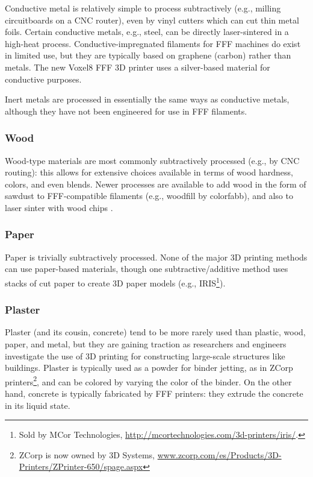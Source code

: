Conductive metal is relatively simple to process subtractively (e.g., milling circuitboards on a CNC router), even by vinyl cutters which can cut thin metal foils. Certain conductive metals, e.g., steel, can be directly laser-sintered in a high-heat process. Conductive-impregnated filaments for FFF machines do exist in limited use, but they are typically based on graphene (carbon) rather than metals. The new Voxel8 FFF 3D printer \cite{voxel8} uses a silver-based material for conductive purposes.

Inert metals are processed in essentially the same ways as conductive metals, although they have not been engineered for use in FFF filaments.

\subsubsection{Wood}

Wood-type materials are most commonly subtractively processed (e.g., by CNC routing): this allows for extensive choices available in terms of wood hardness, colors, and even blends. Newer processes are available to add wood in the form of sawdust to FFF-compatible filaments (e.g., woodfill by colorfabb), and also to laser sinter with wood chips \cite{materialise-wood}.

\subsubsection{Paper}

Paper is trivially subtractively processed. None of the major 3D printing methods can use paper-based materials, though one subtractive/additive method uses stacks of cut paper to create 3D paper models (e.g., IRIS\footnote{Sold by MCor Technologies, \url{http://mcortechnologies.com/3d-printers/iris/}.}).

\subsubsection{Plaster}

Plaster (and its cousin, concrete) tend to be more rarely used than plastic, wood, paper, and metal, but they are gaining traction as researchers and engineers investigate the use of 3D printing for constructing large-scale structures like buildings. Plaster is typically used as a powder for binder jetting, as in ZCorp printers\footnote{ZCorp is now owned by 3D Systems, \url{www.zcorp.com/es/Products/3D-Printers/ZPrinter-650/spage.aspx}}, and can be colored by varying the color of the binder. On the other hand, concrete is typically fabricated by FFF printers: they extrude the concrete in its liquid state.

